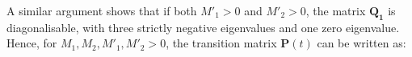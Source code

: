 \documentclass[11pt]{article}
\begin{document}
A similar argument shows that if both $M'_1>0$ and $M'_2>0$, the matrix $\mathbf{Q_{1}}$ is diagonalisable,
with three strictly negative eigenvalues and one zero eigenvalue.
%
Hence, for $M_{1}, M_{2},M'_{1}, M'_{2} >0$, the transition matrix $\mathbf{P}(t)$ can be written as:
\end{document}
